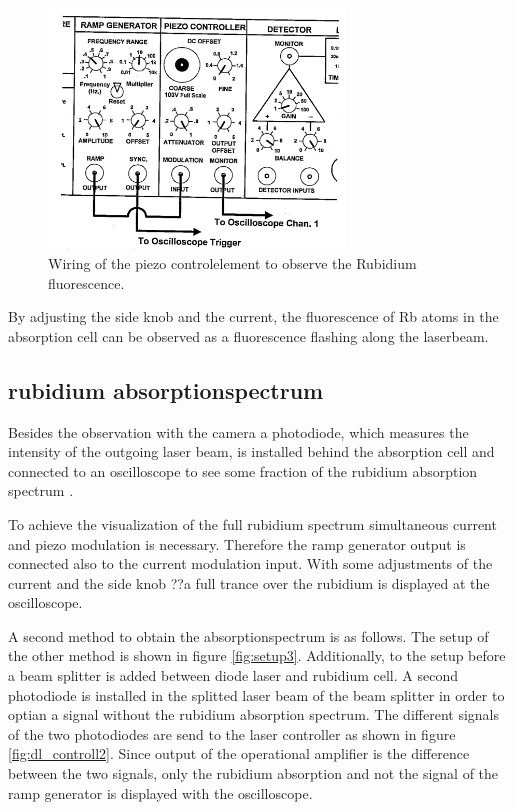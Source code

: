 \begin{figure}
  \centering
  \includegraphics[width=0.7\textwidth]{wiring.png}
  \caption{Wiring of the piezo controlelement to observe the Rubidium fluorescence.\cite{V61}}
  \label{fig:dl_controll}
\end{figure}

By adjusting the side knob and the current,
the fluorescence of Rb atoms in the absorption cell
can be observed
as a fluorescence flashing along the laserbeam.

\subsection{rubidium absorptionspectrum}
\label{subsec:rubidium_absorptionspectrum}

Besides the observation with the camera a photodiode,
which measures the intensity
of the outgoing laser beam,
is installed behind the absorption cell and
connected to an oscilloscope to
see some fraction of the rubidium absorption spectrum .

To achieve the visualization of the full rubidium
spectrum
simultaneous current and piezo modulation
is necessary. Therefore the ramp generator output
is connected also to the current modulation input.
With some adjustments of the current and the side knob
??a full trance over the rubidium is displayed at the oscilloscope.

A second method to obtain the absorptionspectrum
is as follows.
The setup of the other method is shown in
figure \ref{fig:setup3}.
Additionally, to the setup before a beam splitter is added
between diode laser and rubidium cell.
A second photodiode is installed in the splitted laser beam of the beam splitter
in order to optian a signal without the rubidium absorption spectrum.
The different signals of the two photodiodes are send to the
laser controller as shown in figure \ref{fig:dl_controll2}.
Since output of the operational amplifier is
the  difference between the two signals,
only the rubidium absorption and not the signal of the ramp generator is
displayed with the oscilloscope.


